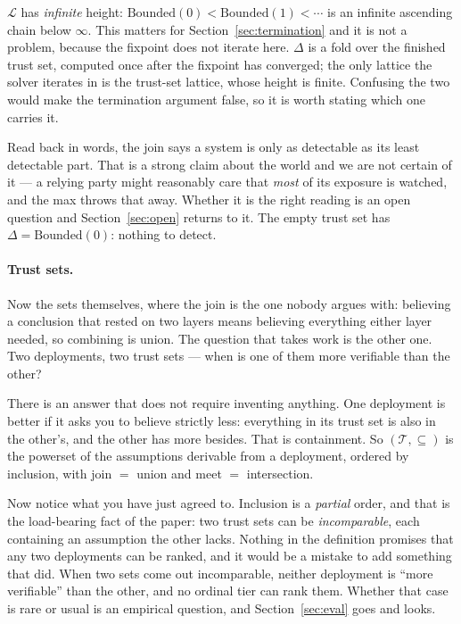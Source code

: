 \documentclass[11pt]{article}
\newcommand{\Never}{\infty}
\begin{document}
$\mathcal{L}$ has \emph{infinite} height: $\mathrm{Bounded}(0) <
\mathrm{Bounded}(1) < \cdots$ is an infinite ascending chain below $\Never$.
This matters for Section~\ref{sec:termination} and it is not a problem,
because the fixpoint does not iterate here. $\Delta$ is a fold over the
finished trust set, computed once after the fixpoint has converged; the only
lattice the solver iterates in is the trust-set lattice, whose height is
finite. Confusing the two would make the termination argument false, so it is
worth stating which one carries it.

Read back in words, the join says a system is only as detectable as its least
detectable part. That is a strong claim about the world and we are not
certain of it --- a relying party might reasonably care that \emph{most} of
its exposure is watched, and the max throws that away. Whether it is the
right reading is an open question and Section~\ref{sec:open} returns to it.
The empty trust set has $\Delta = \mathrm{Bounded}(0)$: nothing to detect.

\paragraph{Trust sets.} Now the sets themselves, where the join is the one
nobody argues with: believing a conclusion that rested on two layers means
believing everything either layer needed, so combining is union. The question
that takes work is the other one. Two deployments, two trust sets --- when is
one of them more verifiable than the other?

There is an answer that does not require inventing anything. One deployment
is better if it asks you to believe strictly less: everything in its trust
set is also in the other's, and the other has more besides. That is
containment. So $(\mathcal{T}, \subseteq)$ is the powerset of the assumptions
derivable from a deployment, ordered by inclusion, with join $=$ union and
meet $=$ intersection.

Now notice what you have just agreed to. Inclusion is a \emph{partial} order,
and that is the load-bearing fact of the paper: two trust sets can be
\emph{incomparable}, each containing an assumption the other lacks. Nothing
in the definition promises that any two deployments can be ranked, and it
would be a mistake to add something that did. When two sets come out
incomparable, neither deployment is ``more verifiable'' than the other, and
no ordinal tier can rank them. Whether that case is rare or usual is an
empirical question, and Section~\ref{sec:eval} goes and looks.
\end{document}
